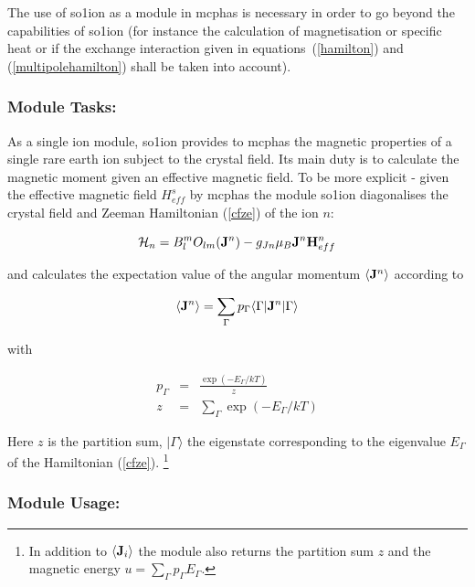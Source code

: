 The use 
 of {\prg so1ion} as a module in {\prg mcphas} is necessary in order to 
 go beyond the capabilities of {\prg so1ion} (for instance the calculation
 of magnetisation or specific heat or if the exchange interaction
 given in equations~(\ref{hamilton}) and (\ref{multipolehamilton})
  shall be taken into account).  

\subsubsection{Module Tasks:}


As a single ion module, {\prg so1ion} provides to {\prg mcphas} the magnetic properties
of a single rare earth ion subject to the crystal field. Its main duty is
to calculate the magnetic moment given an effective magnetic field. 
To be more explicit - given the effective magnetic field $H^s_{eff}$ by {\prg mcphas}
 the module {\prg so1ion}
 diagonalises the crystal field and Zeeman Hamiltonian (\ref{cfze}) of the
 ion $n$:

\begin{equation}\label{cfze}
 {\mathcal H_n}=  B_l^m O_{lm}({\mathbf J}^n) 
	     -  g_{Jn} \mu_B {\mathbf J}^n {\mathbf H^n_{eff}} 
\end{equation}

and calculates the expectation value of the angular momentum
 $\langle \mathbf J^n \rangle$
according to

\begin{equation}
\langle \mathbf J^n \rangle =
\sum_{\Gamma} p_{\Gamma} \langle \Gamma | \mathbf J^n | \Gamma \rangle
\end{equation}

with 

\begin{eqnarray}
p_{\Gamma}&=&\frac{\exp(-E_{\Gamma}/kT)}{z}\\
z&=&\sum_{\Gamma} \exp(-E_{\Gamma}/kT)
\end{eqnarray}

Here $z$ is the partition sum, $|\Gamma\rangle$ the eigenstate corresponding to
the eigenvalue $E_{\Gamma}$ of the Hamiltonian (\ref{cfze}). 
\footnote{In addition to $\langle \mathbf J_i \rangle$ the module also returns
the partition sum $z$ and the magnetic energy $u=\sum_{\Gamma} p_{\Gamma} E_{\Gamma}$.}

\subsubsection{Module Usage:}
 

